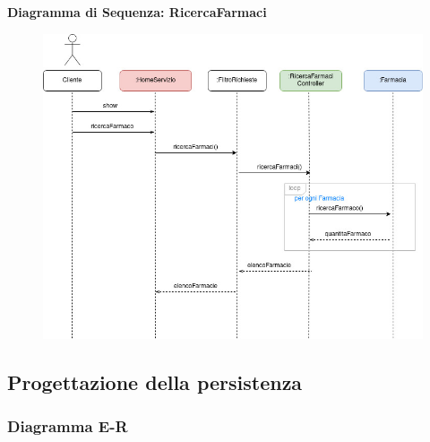 \newpage

\textbf{Diagramma di Sequenza: RicercaFarmaci}
\begin{figure}[h!]
    \begin{center}
        \includegraphics[width=\textwidth]{immagini/Interazione-RicercaFarmaco-progettaz.jpg}
    \end{center}
\end{figure}

\newpage

\subsection{Progettazione della persistenza}

\subsubsection*{Diagramma E-R}

